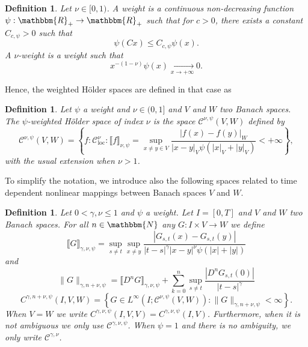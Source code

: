 \documentclass[a4paper,11pt]{article}
\newcommand{\tmop}[1]{\ensuremath{\operatorname{#1}}}
\newtheorem{definition}[theorem]{Definition}
\newcommand{\CC}{\mathscr C}
\begin{document}
\begin{definition}
  \label{definition:nu_weight}Let $\nu \in [ 0,1 )$. A weight is a continuous
  non-decreasing function $\psi :\mathbbm{R}_{+} \rightarrow \mathbbm{R}_{+}$
  such that for $c>0$, there exists a constant $C_{c, \psi} >0$ such that
  \[ \psi ( C x ) \leqslant C_{c, \psi} \psi ( x ) . \]
  A $\nu$-weight is a weight such that
  \[ x^{- ( 1- \nu )} \psi ( x ) \xrightarrow[x \rightarrow + \infty]{} 0. \]
\end{definition}

Hence, the weighted H\"older spaces are defined in that case as

\begin{definition}
  Let $\psi$ a weight and $\nu \in ( 0,1 ]$ and $V$ and $W$ two Banach spaces.
  The $\psi$-weighted H\"older space of index $\nu$ is the space $\CC^{\nu ,
  \psi} ( V,W )$ defined by
  \[ \CC^{\nu , \psi} ( V,W ) = \left\{ f: \CC^{\nu}_{\tmop{loc}} : \llbracket
     f \rrbracket_{\nu , \psi} = \sup_{x \neq y \in V} \frac{| f ( x ) -f ( y
     ) |_{W}}{| x-y |_{V} \psi ( | x |_{V} + | y |_{V} )} <+ \infty \right\} ,
  \]
  with the usual extension when $\nu >1$.
\end{definition}

To simplify the notation, we introduce also the following spaces related to
time dependent nonlinear mappings between Banach spaces $V$ and $W$.

\begin{definition}
  Let $0< \gamma , \nu \leqslant 1$ and $\psi$ a weight. Let $I= [0,T]$ and
  $V$ and $W$ two Banach spaces. For all $n \in \mathbbm{N}$ any $G:I \times V
  \rightarrow W$ we define
  \[ \llbracket G \rrbracket_{\gamma , \nu , \psi} = \sup_{s \neq t}  
     \sup_{x \neq y} \frac{| G_{s,t} ( x ) -G_{s,t} ( y ) |}{| t-s |^{\gamma}
     | x-y |^{\nu} \psi ( | x | + | y | )} \]
  and
  \[ \| G \|_{\gamma ,n+ \nu , \psi} = \llbracket D^{n} G \rrbracket_{\gamma ,
     \nu , \psi} + \sum_{k=0}^{n} \sup_{s \neq t} \frac{| D^{n} G_{s,t} ( 0
     ) |}{| t-s |^{\gamma}} \]
  \[ C^{\gamma ,n+ \nu , \psi} (I,V,W) = \left\{ G \in L^{\infty} \left( I;
     \CC^{\nu , \psi} ( V,W ) \right) :\|G\|_{\gamma ,n+ \nu , \psi} < \infty
     \right\} . \]
  When $V=W$ we write $C^{\gamma , \nu , \psi} (I,V,V) =C^{\gamma , \nu ,
  \psi} (I,V)$. Furthermore, when it is not ambiguous we only use $\CC^{\gamma
  , \nu , \psi}$. When $\psi =1$ and there is no ambiguity, we only write
  $\CC^{\gamma , \nu}$.
\end{definition}
\end{document}
